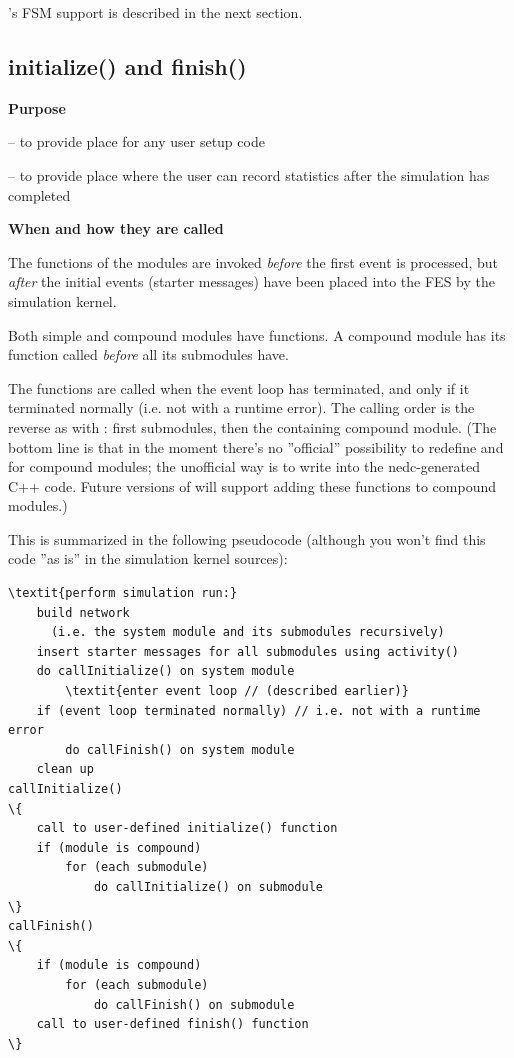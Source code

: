 {\opp}'s FSM support is described in the next section.



\subsection{initialize() and finish()}

\textbf{Purpose}


 -- to provide place for any user setup code

 -- to provide place where the user can record statistics 
after the simulation has completed


\textbf{When and how they are called}


The  functions of the modules are invoked
\textit{before} the first event is processed, but \textit{after} the
initial events (starter messages) have been
placed into the FES by the simulation kernel.


Both simple and compound modules have  functions.
A compound module has its  function called
\textit{before} all its submodules have.


The  functions are called when the event
loop has terminated, and only if it terminated
normally (i.e. not with a runtime error).  The calling order is the
reverse as with : first submodules, then the
containing compound module. (The bottom line is that in the moment
there's no ''official'' possibility to redefine 
and  for compound modules; the unofficial way is to
write into the nedc-generated C++ code. Future versions of {\opp} will
support adding these functions to compound
modules.)

This is summarized in the following pseudocode (although you 
won't find this code ''as is'' in the simulation 
kernel sources):


\begin{Verbatim}[commandchars=\\\{\}]
\textit{perform simulation run:}
    build network
      (i.e. the system module and its submodules recursively)
    insert starter messages for all submodules using activity()
    do callInitialize() on system module
        \textit{enter event loop // (described earlier)}
    if (event loop terminated normally) // i.e. not with a runtime 
error
        do callFinish() on system module
    clean up
callInitialize()
\{
    call to user-defined initialize() function
    if (module is compound)
        for (each submodule)
            do callInitialize() on submodule
\}
callFinish()
\{
    if (module is compound)
        for (each submodule)
            do callFinish() on submodule
    call to user-defined finish() function
\}
\end{Verbatim}
  


